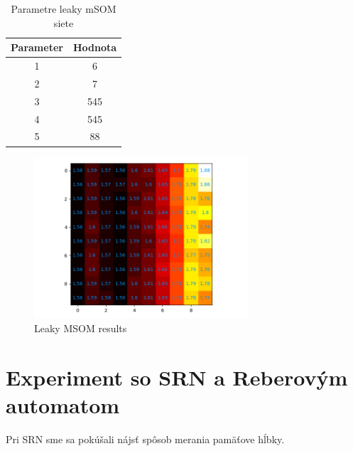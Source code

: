 \begin{table}[h!]
    \centering
    \begin{tabular}{|c|c|} 
     \hline
     Parameter & Hodnota \\ 
     \hline\hline
     1 & 6  \\ 
     \hline
     2 & 7   \\
     \hline
     3 & 545  \\
     \hline
     4 & 545  \\
     \hline
     5 & 88 \\  
     \hline
    \end{tabular}
    \caption{Parametre leaky mSOM siete}
    \label{table:2}
\end{table}

\begin{figure}[H]
    \centering
    \includegraphics[width=8cm]{assets/leakymsom_abcd}
    \caption{Leaky MSOM results}
\end{figure}


\section{Experiment so SRN a Reberovým automatom}
Pri SRN sme sa pokúšali nájsť spôsob merania pamäťove hĺbky.




